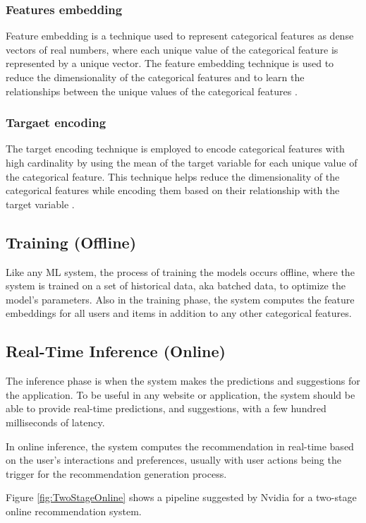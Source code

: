 \subsubsection{Features embedding}
Feature embedding is a technique used to represent categorical features as dense vectors of real numbers, where each unique value of the categorical feature is represented by a unique vector. The feature embedding technique is used to reduce the dimensionality of the categorical features and to learn the relationships between the unique values of the categorical features \cite{FeatureEmbedding}.
\subsubsection{Targaet encoding}
The target encoding technique is employed to encode categorical features with high cardinality by using the mean of the target variable for each unique value of the categorical feature. This technique helps reduce the dimensionality of the categorical features while encoding them based on their relationship with the target variable \cite{TargetEncoding}.
\subsection{Training (Offline)}
Like any ML system, the process of training the models occurs offline,
where the system is trained on a set of historical data, aka batched data, to optimize the model's parameters.
Also in the training phase, the system computes the feature embeddings for all users and items in addition to any other categorical features.


\subsection{Real-Time Inference (Online)}
The inference phase is when the system makes the predictions and suggestions for the application.
To be useful in any website or application, 
the system should be able to provide real-time predictions, 
and suggestions, with a few hundred milliseconds of latency.

In online inference, the system computes the recommendation in real-time based on the user's interactions and preferences, 
usually with user actions being the trigger for the recommendation generation process.

Figure \ref{fig:TwoStageOnline} shows a pipeline suggested by Nvidia\cite{NvidiaFeatureStores} for a two-stage online recommendation system.

